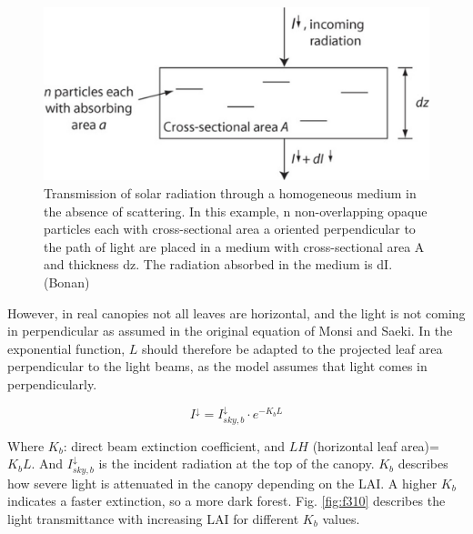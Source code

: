 \documentclass[12pt,oneside]{book}
\begin{document}
\begin{figure}

{\centering \includegraphics[width=0.8\linewidth]{figures/chap3/f39_beer} 

}

\caption{Transmission of solar radiation through a homogeneous medium in the absence of scattering. In this example, n non-overlapping opaque particles each with cross-sectional area a oriented perpendicular to the path of light are placed in a medium with cross-sectional area A and thickness dz. The radiation absorbed in the medium is dI.(Bonan)}\label{fig:f39}
\end{figure}

However, in real canopies not all leaves are horizontal, and the light
is not coming in perpendicular as assumed in the original equation of
Monsi and Saeki. In the exponential function, \(L\) should therefore be
adapted to the projected leaf area perpendicular to the light beams, as
the model assumes that light comes in perpendicularly.

\[
I^{\downarrow} = I^{\downarrow}_{sky,b}\cdot e^{-K_bL}
\]

Where \(K_b\): direct beam extinction coefficient, and \(LH\)
(horizontal leaf area)= \(K_b L\). And \(I^{\downarrow}_{sky,b}\) is the
incident radiation at the top of the canopy. \(K_b\) describes how
severe light is attenuated in the canopy depending on the LAI. A higher
\(K_b\) indicates a faster extinction, so a more dark forest. Fig.
\ref{fig:f310} describes the light transmittance with increasing LAI for
different \(K_b\) values.
\end{document}
